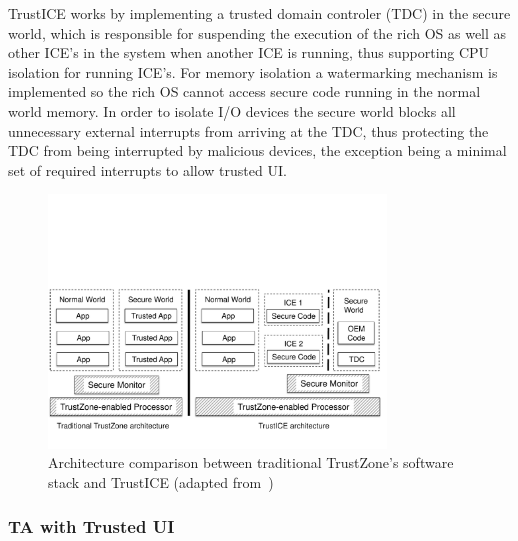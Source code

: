 TrustICE works by implementing a trusted domain controler (TDC) in the secure world, which is responsible for suspending the execution of the rich OS as well as other ICE's in the system when another ICE is running, thus supporting CPU isolation for running ICE's. For memory isolation a watermarking mechanism is implemented so the rich OS cannot access secure code running in the normal world memory. In order to isolate I/O devices the secure world blocks all unnecessary external interrupts from arriving at the TDC, thus protecting the TDC from being interrupted by malicious devices, the exception being a minimal set of required interrupts to allow trusted UI. 

\begin{figure}[t!]
	\centering
	\includegraphics[width=0.80\textwidth]{img/trustICE.pdf}
	\caption{Architecture comparison between traditional TrustZone's software stack and TrustICE (adapted from~\cite{sun2015trustice})}
	\label{fig:trustICE_architecture}
\end{figure}

\subsubsection{TA with Trusted UI}

